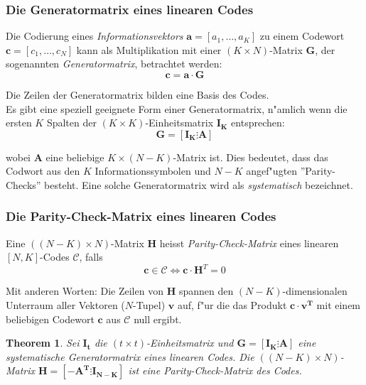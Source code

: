 \documentclass[german, 10pt, a4paper, twocolumn]{scrartcl}
\newtheorem{theorem}{Theorem}
\begin{document}
\subsubsection{Die Generatormatrix eines linearen Codes}

Die Codierung eines \textit{Informationsvektors} $\mathbf{a}=[a_1,\ldots,a_K]$ zu einem Codewort $\mathbf{c} = [c_1,\ldots, c_N]$ kann als Multiplikation mit einer $(K\times N)$-Matrix $\mathbf{G}$, der sogenannten \textit{Generatormatrix}, betrachtet werden:
\begin{displaymath}
	\mathbf{c} = \mathbf{a} \cdotp \mathbf{G}
\end{displaymath}

Die Zeilen der Generatormatrix bilden eine Basis des Codes.\\

Es gibt eine speziell geeignete Form einer Generatormatrix, n"amlich wenn die ersten $K$ Spalten der $(K\times K)$-Einheitsmatrix $\mathbf{I_K}$ entsprechen:
\begin{displaymath}
	\mathbf{G} = [ \mathbf{I_K} \vdots  \mathbf{A}]
\end{displaymath}

wobei $\mathbf{A}$ eine beliebige $K\times ( N- K )$-Matrix ist. Dies bedeutet, dass das Codwort aus den $K$ Informationssymbolen und $N-K$ angef"ugten ''Parity-Checks'' besteht. Eine solche Generatormatrix wird als \textit{systematisch} bezeichnet.

\subsubsection{Die Parity-Check-Matrix eines linearen Codes}

Eine $((N-K)\times N)$-Matrix $\mathbf{H}$ heisst \textit{Parity-Check-Matrix} eines linearen $[N,K]$-Codes $\mathcal{C}$, falls
\begin{displaymath}
	\mathbf{c} \in \mathcal{C}  \Leftrightarrow \mathbf{c}\cdotp\mathbf{H}^T = 0
\end{displaymath}

Mit anderen Worten: Die Zeilen von $\mathbf{H}$ spannen den $(N-K)$-dimensionalen Unterraum aller Vektoren ($N$-Tupel) $\mathbf{v}$ auf, f"ur die das Produkt $\mathbf{c}\cdotp \mathbf{v^T}$ mit einem beliebigen Codewort $\mathbf{c}$ aus $\mathcal{C}$ null ergibt.

\begin{theorem}
	Sei $\mathbf{I_t}$ die $(t\times t)$-Einheitsmatrix und $\mathbf{G} = [ \mathbf{I_K}\vdots \mathbf{A}]$ eine systematische Generatormatrix eines linearen Codes. Die $((N-K)\times N)$-Matrix $\mathbf{H}= [-\mathbf{A^T}\vdots \mathbf{I_{N-K}}]$ ist eine Parity-Check-Matrix des Codes.
\end{theorem}
\end{document}
